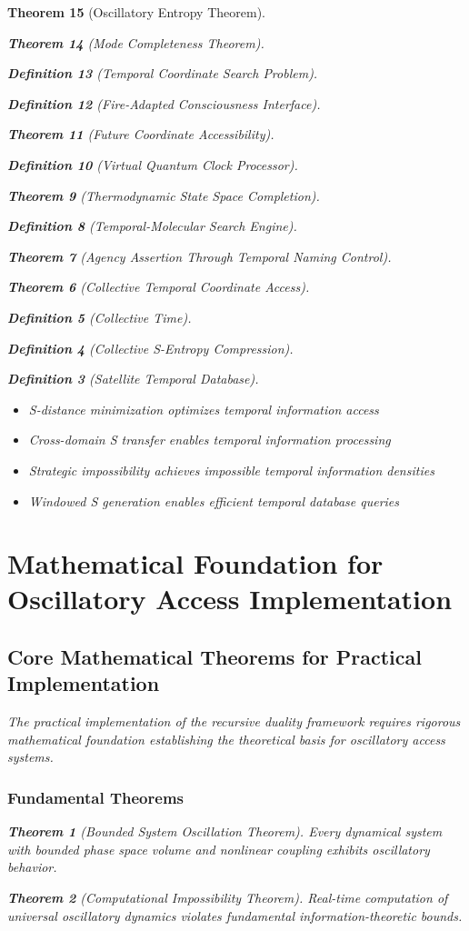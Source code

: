 \documentclass[12pt,a4paper]{article}
\newtheorem{theorem}{Theorem}[section]
\newtheorem{definition}[theorem]{Definition}
\begin{document}
\begin{theorem}[Oscillatory Entropy Theorem]
\begin{theorem}[Mode Completeness Theorem]
\begin{enumerate}
\begin{definition}[Temporal Coordinate Search Problem]
\begin{algorithm}
\begin{definition}[Fire-Adapted Consciousness Interface]
\begin{theorem}[Future Coordinate Accessibility]
\begin{definition}[Virtual Quantum Clock Processor]
\begin{itemize}
\begin{itemize}
\begin{theorem}[Thermodynamic State Space Completion]
\begin{definition}[Temporal-Molecular Search Engine]
\begin{theorem}[Agency Assertion Through Temporal Naming Control]
\begin{remark}
\begin{theorem}[Collective Temporal Coordinate Access]
\begin{definition}[Collective Time]
\begin{definition}[Collective S-Entropy Compression]
\begin{definition}[Satellite Temporal Database]
\begin{algorithm}
\begin{table}[h]
{{\begin{itemize}
\item S-distance minimization optimizes temporal information access
\item Cross-domain S transfer enables temporal information processing
\item Strategic impossibility achieves impossible temporal information densities
\item Windowed S generation enables efficient temporal database queries
\end{itemize}

\section{Mathematical Foundation for Oscillatory Access Implementation}

\subsection{Core Mathematical Theorems for Practical Implementation}

The practical implementation of the recursive duality framework requires rigorous mathematical foundation establishing the theoretical basis for oscillatory access systems.

\subsubsection{Fundamental Theorems}

\begin{theorem}[Bounded System Oscillation Theorem]
Every dynamical system with bounded phase space volume and nonlinear coupling exhibits oscillatory behavior.
\end{theorem}

\begin{theorem}[Computational Impossibility Theorem]
Real-time computation of universal oscillatory dynamics violates fundamental information-theoretic bounds.
\end{theorem}

}}
\end{table}
\end{algorithm}
\end{definition}
\end{definition}
\end{definition}
\end{theorem}
\end{remark}
\end{theorem}
\end{definition}
\end{theorem}
\end{itemize}
\end{itemize}
\end{definition}
\end{theorem}
\end{definition}
\end{algorithm}
\end{definition}
\end{enumerate}
\end{theorem}
\end{theorem}
\end{document}
